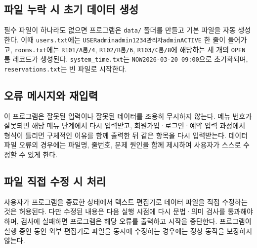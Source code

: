 \documentclass[a4paper,10pt]{article}
\newcommand{\softsep}{\textbar}
\begin{document}
\subsection{파일 누락 시 초기 데이터 생성}
필수 파일이 하나라도 없으면 프로그램은 \texttt{data/} 폴더를 만들고 기본 파일을 자동 생성한다. 이때 \texttt{users.txt}에는 \texttt{USER\softsep{}admin\softsep{}admin1234\softsep{}관리자\softsep{}admin\softsep{}ACTIVE} 한 줄이 들어가고, \texttt{rooms.txt}에는 \texttt{R101/A룸/4}, \texttt{R102/B룸/6}, \texttt{R103/C룸/8}에 해당하는 세 개의 \texttt{OPEN} 룸 레코드가 생성된다. \texttt{system\_time.txt}는 \texttt{NOW\softsep{}2026-03-20 09:00}으로 초기화되며, \texttt{reservations.txt}는 빈 파일로 시작한다.

\subsection{오류 메시지와 재입력}
이 프로그램은 잘못된 입력이나 잘못된 데이터를 조용히 무시하지 않는다. 메뉴 번호가 잘못되면 해당 메뉴 단계에서 다시 입력받고, 회원가입·로그인·예약 입력 과정에서 형식이 틀리면 구체적인 이유를 함께 출력한 뒤 같은 항목을 다시 입력받는다. 데이터 파일 오류의 경우에는 파일명, 줄번호, 문제 원인을 함께 제시하여 사용자가 스스로 수정할 수 있게 한다.

\subsection{파일 직접 수정 시 처리}
사용자가 프로그램을 종료한 상태에서 텍스트 편집기로 데이터 파일을 직접 수정하는 것은 허용된다. 다만 수정된 내용은 다음 실행 시점에 다시 문법·의미 검사를 통과해야 하며, 검사에 실패하면 프로그램은 해당 오류를 출력하고 시작을 중단한다. 프로그램이 실행 중인 동안 외부 편집기로 파일을 동시에 수정하는 경우에는 정상 동작을 보장하지 않는다.
\end{document}
